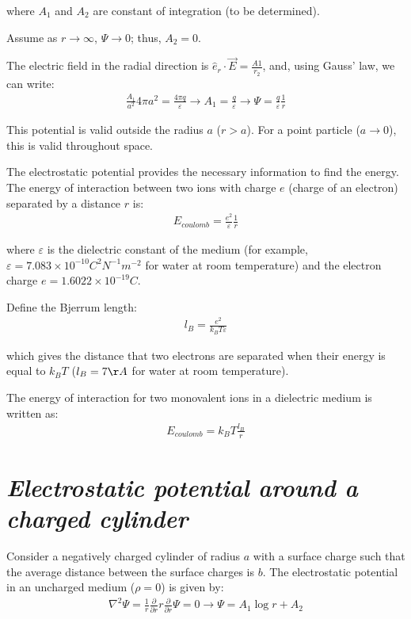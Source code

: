 \documentclass[book.tex]{subfiles}
\begin{document}
\noindent where $A_1$ and $A_2$ are constant of integration (to be determined).

Assume as $r\rightarrow \infty$, $\Psi\rightarrow 0$; thus, $A_2 = 0$.

The electric field in the radial direction is $\hat{e}_r\cdot \vec{E} = \frac{A1}{r_2}$, and, using Gauss' law, we can write:
\begin{align}\label{Eq5}
\frac{A_1}{a^2}4\pi a^2 = \frac{4\pi q}{\varepsilon} \rightarrow A_1 = \frac{q}{\varepsilon} \rightarrow \Psi = \frac{q}{\varepsilon}\frac{1}{r}
\end{align}

This potential is valid outside the radius $a$ ($r > a$). For a point particle ($a\rightarrow 0$), this is valid throughout space.

The electrostatic potential provides the necessary information to
find the energy. The energy of interaction between two ions with charge $e$ (charge of an electron) separated by a distance $r$ is:
\begin{align}\label{Eq6}
E_{coulomb} = \frac{e^2}{\varepsilon}\frac{1}{r}
\end{align}

\noindent where $\varepsilon$ is the dielectric constant of the medium (for example, $\varepsilon = 7.083 \times 10^{-10}C^2N^{-1}m^{-2}$ for water at room temperature) and the electron charge $e = 1.6022\times 10^{-19}C$.

Define the Bjerrum length:
\begin{align}\label{Eq7}
l_B = \frac{e^2}{k_BT\varepsilon}
\end{align}

\noindent which gives the distance that two electrons are separated when their energy is equal to $k_BT$ ($l_B = 7\AA$ for water at room temperature).

The energy of interaction for two monovalent ions in a dielectric
medium is written as:
\begin{align}\label{Eq8}
E_{coulomb}= k_BT\frac{l_B}{r}
\end{align}

\section*{\textit{Electrostatic potential around a charged cylinder}}

Consider a negatively charged cylinder of radius $a$ with a surface
charge such that the average distance between the surface charges is $b$. The electrostatic potential in an uncharged medium ($\rho = 0$) is given by:
\begin{align}\label{Eq9}
\nabla^2\Psi = \frac{1}{r}\frac{\partial}{\partial r}r\frac{\partial}{\partial r}\Psi  = 0 \rightarrow \Psi = A_1\log r + A_2
\end{align}
\end{document}
